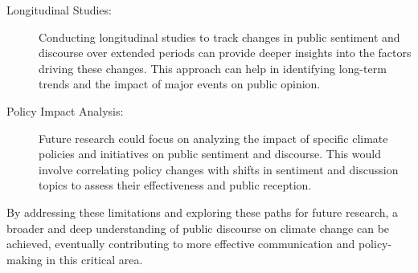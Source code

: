 \begin{description}
    \item[Longitudinal Studies:] Conducting longitudinal studies to track changes in public sentiment and discourse over extended periods can provide deeper insights into the factors driving these changes. This approach can help in identifying long-term trends and the impact of major events on public opinion.
    \item[Policy Impact Analysis:] Future research could focus on analyzing the impact of specific climate policies and initiatives on public sentiment and discourse. This would involve correlating policy changes with shifts in sentiment and discussion topics to assess their effectiveness and public reception.
\end{description}

By addressing these limitations and exploring these paths for future research, a broader and deep understanding of public discourse on climate change can be achieved, eventually contributing to more effective communication and policy-making in this critical area.